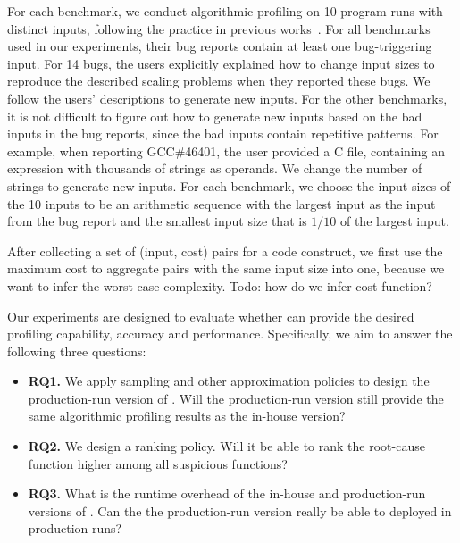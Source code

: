 For each benchmark, we conduct algorithmic profiling on 10 program 
runs with distinct inputs, following the practice 
in previous works~\cite{joy.asplos13,SongOOPSLA2014}.
For all benchmarks used in our experiments, 
their bug reports contain at least one bug-triggering input. 
For 14 bugs, 
the users explicitly explained how to change input sizes 
to reproduce the described scaling problems 
when they reported these bugs. 
We follow the users' descriptions to generate new inputs. 
For the other benchmarks, it is not difficult to figure out 
how to generate new inputs based on the bad inputs in the bug reports,
since the bad inputs contain repetitive patterns. 
For example, when reporting GCC\#46401,
 the user provided a C file, 
containing an expression with thousands of strings as operands. 
We change the number of strings to generate new inputs. 
For each benchmark, we choose the input sizes of the 10 inputs 
to be an arithmetic sequence with the largest input 
as the input from the bug report and the 
smallest input size that is $1/10$ 
of the largest input.

After collecting a set of (input, cost) pairs for a code construct, 
we first use the maximum cost to aggregate pairs with the same input size into one,
because we want to infer the worst-case complexity.
{\color{red} Todo: how do we infer cost function?}

Our experiments are designed to evaluate whether \Tool 
can provide the desired profiling capability, accuracy and performance. 
Specifically, we aim to answer the following three questions:

\begin{itemize}

\item {\bf RQ1.} We apply sampling and other 
approximation policies to design the production-run version of \Tool. 
Will the production-run version still provide the same algorithmic 
profiling results as the in-house version? 

\item {\bf RQ2.} We design a ranking policy. 
Will it be able to rank the root-cause function higher among all suspicious functions?

\item {\bf RQ3.} What is the runtime overhead of the in-house and 
production-run versions of \Tool. Can the the production-run version really be able to deployed in production runs?



\end{itemize}

